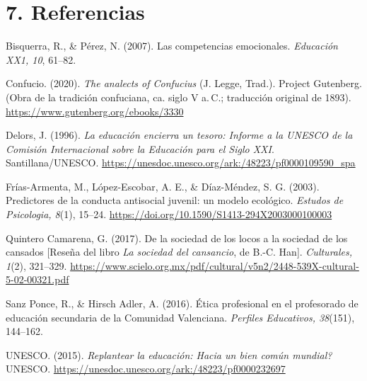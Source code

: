 \documentclass[12pt]{article}
\newenvironment{referencias}
  {\begin{list}{}{\setlength{\leftmargin}{0.5in}\setlength{\itemindent}{-0.5in}%
    \setlength{\itemsep}{0.5\baselineskip}\setlength{\parsep}{0pt}}}
  {\end{list}}
\begin{document}
\section*{7. Referencias}
\begin{referencias}

\item Bisquerra, R., \& Pérez, N. (2007). Las competencias emocionales.
\textit{Educación XX1, 10}, 61--82.

\item Confucio. (2020). \textit{The analects of Confucius} (J. Legge, Trad.). Project
Gutenberg. (Obra de la tradición confuciana, ca. siglo V a.\,C.; traducción original de
1893). \url{https://www.gutenberg.org/ebooks/3330}

\item Delors, J. (1996). \textit{La educación encierra un tesoro: Informe a la UNESCO de la
Comisión Internacional sobre la Educación para el Siglo XXI}. Santillana/UNESCO.
\url{https://unesdoc.unesco.org/ark:/48223/pf0000109590_spa}

\item Frías-Armenta, M., López-Escobar, A. E., \& Díaz-Méndez, S. G. (2003). Predictores de
la conducta antisocial juvenil: un modelo ecológico. \textit{Estudos de Psicologia, 8}(1),
15--24. \url{https://doi.org/10.1590/S1413-294X2003000100003}

\item Quintero Camarena, G. (2017). De la sociedad de los locos a la sociedad de los
cansados [Reseña del libro \textit{La sociedad del cansancio}, de B.-C. Han].
\textit{Culturales, 1}(2), 321--329. \url{https://www.scielo.org.mx/pdf/cultural/v5n2/2448-539X-cultural-5-02-00321.pdf}

\item Sanz Ponce, R., \& Hirsch Adler, A. (2016). Ética profesional en el profesorado de
educación secundaria de la Comunidad Valenciana. \textit{Perfiles Educativos, 38}(151),
144--162.

\item UNESCO. (2015). \textit{Replantear la educación: \textquestiondown{}Hacia un bien común mundial?}
UNESCO. \url{https://unesdoc.unesco.org/ark:/48223/pf0000232697}

\end{referencias}
\end{document}
